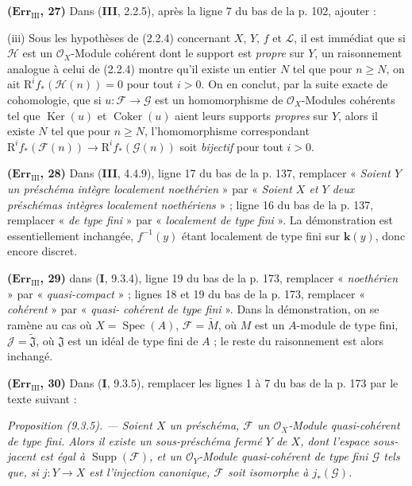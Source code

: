 \noindent\textbf{($\mathbf{Err}_{\mathrm{III}}$, 27)} Dans (\textbf{III}, 2.2.5),
après la ligne 7 du bas de la p. 102, ajouter :

(iii) Sous les hypothèses de (2.2.4) concernant $X$, $Y$, $f$ et $\mathscr L$,
il est immédiat que si $\mathscr H$ est un $\mathscr O_X$-Module cohérent dont
le support est \emph{propre} sur $Y$, un raisonnement analogue à celui de
(2.2.4) montre qu'il existe un entier $N$ tel que pour $n\geq N$, on ait
$\mathrm R^if_*(\mathscr H(n))=0$ pour tout $i>0$. On en conclut, par la suite
exacte de cohomologie, que si $u:\mathscr F\to\mathscr G$ est un homomorphisme
de $\mathscr O_X$-Modules cohérents tel que $\operatorname{Ker}(u)$ et
$\operatorname{Coker}(u)$ aient leurs supports \emph{propres} sur $Y$, alors il
existe $N$ tel que pour $n\geq N$, l'homomorphisme correspondant
$\mathrm R^if_*(\mathscr F(n))\to\mathrm R^if_*(\mathscr G(n))$ soit
\emph{bijectif} pour tout $i>0$.

\noindent\textbf{($\mathbf{Err}_{\mathrm{III}}$, 28)} Dans (\textbf{III}, 4.4.9),
ligne 17 du bas de la p. 137, remplacer « \emph{Soient $Y$ un préschéma
intègre localement noethérien} » par « \emph{Soient $X$ et $Y$ deux
préschémas intègres localement noethériens} » ; ligne 16 du bas de la p.
137, remplacer « \emph{de type fini} » par « \emph{localement de type
fini} ». La démonstration est essentiellement inchangée,
$f^{-1}(y)$ étant localement de type fini sur $\boldsymbol{k}(y)$, donc encore discret.

\noindent\textbf{($\mathbf{Err}_{\mathrm{III}}$, 29)} dans (\textbf{I}, 9.3.4), ligne
19 du bas de la p. 173, remplacer « \emph{noethérien} » par
« \emph{quasi-compact} » ; lignes 18 et 19 du bas de la p. 173, remplacer
« \emph{cohérent} » par « \emph{quasi-}%
\emph{cohérent de type fini} ». Dans la
démonstration, on se ramène au cas où
$X=\operatorname{Spec}(A)$, $\mathscr F=\widetilde M$, où $M$ est un $A$-module
de type fini, $\mathscr J=\widetilde{\mathfrak J}$, où $\mathfrak J$ est un
idéal de type fini de $A$ ; le reste du raisonnement est alors inchangé.

\noindent\textbf{($\mathbf{Err}_{\mathrm{III}}$, 30)} Dans (\textbf{I}, 9.3.5),
remplacer les lignes 1 à 7 du bas de la p. 173 par le texte suivant :

\emph{Proposition (9.3.5). --- Soient $X$ un préschéma, $\mathscr F$ un
$\mathscr O_X$-Module quasi-cohérent de type fini. Alors il existe un
sous-préschéma fermé $Y$ de $X$, dont l'espace sous-jacent est égal à
$\operatorname{Supp}(\mathscr F)$, et un $\mathscr O_Y$-Module quasi-cohérent de
type fini $\mathscr G$ tels que, si $j:Y\to X$ est l'injection canonique,
$\mathscr F$ soit isomorphe à $j_*(\mathscr G)$.}

